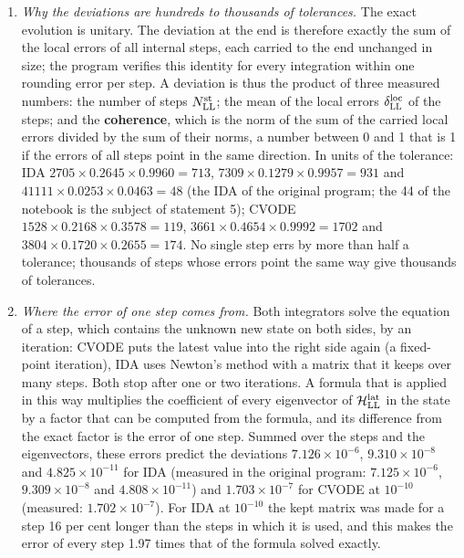\documentclass[
  10pt,
]{article}
\providecommand{\tightlist}{%
  \setlength{\itemsep}{0pt}\setlength{\parskip}{0pt}}
\begin{document}
\begin{enumerate}
\def\labelenumi{\arabic{enumi}.}
\tightlist
\item
  \emph{Why the deviations are hundreds to thousands of tolerances.} The
  exact evolution is unitary. The deviation at the end is therefore
  exactly the sum of the local errors of all internal steps, each
  carried to the end unchanged in size; the program verifies this
  identity for every integration within one rounding error per step. A
  deviation is thus the product of three measured numbers: the number of
  steps \(N^{\rm st}_{\rm LL}\); the mean of the local errors
  \(\delta^{\rm loc}_{\rm LL}\) of the steps; and the
  \textbf{coherence}, which is the norm of the sum of the carried local
  errors divided by the sum of their norms, a number between 0 and 1
  that is 1 if the errors of all steps point in the same direction. In
  units of the tolerance: IDA \(2705\times0.2645\times0.9960=713\),
  \(7309\times0.1279\times0.9957=931\) and
  \(41111\times0.0253\times0.0463=48\) (the IDA of the original program;
  the 44 of the notebook is the subject of statement 5); CVODE
  \(1528\times0.2168\times0.3578=119\),
  \(3661\times0.4654\times0.9992=1702\) and
  \(3804\times0.1720\times0.2655=174\). No single step errs by more than
  half a tolerance; thousands of steps whose errors point the same way
  give thousands of tolerances.
\item
  \emph{Where the error of one step comes from.} Both integrators solve
  the equation of a step, which contains the unknown new state on both
  sides, by an iteration: CVODE puts the latest value into the right
  side again (a fixed-point iteration), IDA uses Newton's method with a
  matrix that it keeps over many steps. Both stop after one or two
  iterations. A formula that is applied in this way multiplies the
  coefficient of every eigenvector of \(\mathcal H^{\rm lat}_{\rm LL}\)
  in the state by a factor that can be computed from the formula, and
  its difference from the exact factor is the error of one step. Summed
  over the steps and the eigenvectors, these errors predict the
  deviations \(7.126\times10^{-6}\), \(9.310\times10^{-8}\) and
  \(4.825\times10^{-11}\) for IDA (measured in the original program:
  \(7.125\times10^{-6}\), \(9.309\times10^{-8}\) and
  \(4.808\times10^{-11}\)) and \(1.703\times10^{-7}\) for CVODE at
  \(10^{-10}\) (measured: \(1.702\times10^{-7}\)). For IDA at
  \(10^{-10}\) the kept matrix was made for a step 16 per cent longer
  than the steps in which it is used, and this makes the error of every
  step 1.97 times that of the formula solved exactly.

\end{enumerate}
\end{document}
